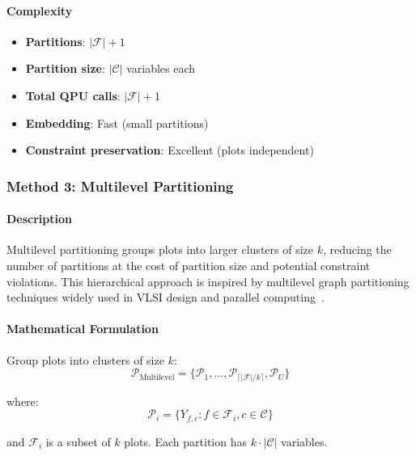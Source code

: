 \documentclass{oqireport}
\begin{document}
\paragraph{Complexity}
\begin{itemize}
\item \textbf{Partitions}: $|\mathcal{F}| + 1$
\item \textbf{Partition size}: $|\mathcal{C}|$ variables each
\item \textbf{Total QPU calls}: $|\mathcal{F}| + 1$
\item \textbf{Embedding}: Fast (small partitions)
\item \textbf{Constraint preservation}: Excellent (plots independent)
\end{itemize}

\subsubsection{Method 3: Multilevel Partitioning}

\paragraph{Description}
Multilevel partitioning groups plots into larger clusters of size $k$, reducing the number of partitions at the cost of partition size and potential constraint violations. This hierarchical approach is inspired by multilevel graph partitioning techniques widely used in VLSI design and parallel computing~\cite{karypis1998fast, hendrickson1995multilevel}.

\paragraph{Mathematical Formulation}

Group plots into clusters of size $k$:
\begin{equation}
\mathcal{P}_{\text{Multilevel}} = \{\mathcal{P}_1, \ldots, \mathcal{P}_{\lceil |\mathcal{F}|/k \rceil}, \mathcal{P}_U\}
\end{equation}

where:
\begin{equation}
\mathcal{P}_i = \{Y_{f,c} : f \in \mathcal{F}_i, c \in \mathcal{C}\}
\end{equation}

and $\mathcal{F}_i$ is a subset of $k$ plots. Each partition has $k \cdot |\mathcal{C}|$ variables.
\end{document}
